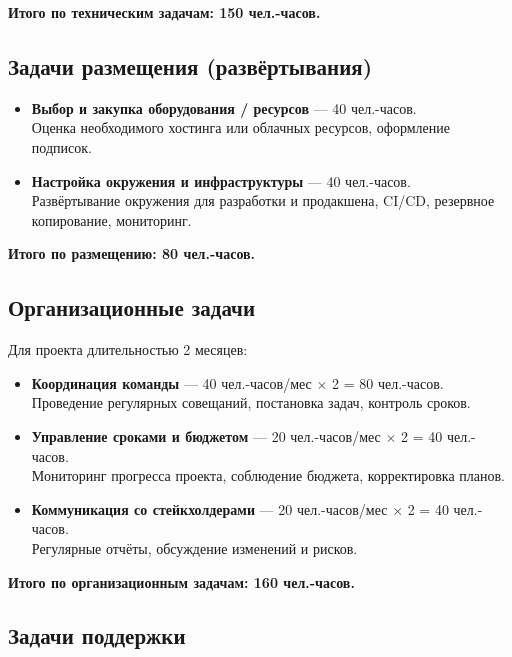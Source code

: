 \documentclass[14pt, russian]{matmex-diploma-custom}
\begin{document}
\textbf{Итого по техническим задачам: 150 чел.-часов.}

\subsection{Задачи размещения (развёртывания)}

\begin{itemize}
    \item \textbf{Выбор и закупка оборудования / ресурсов} — 40 чел.-часов.\\
    Оценка необходимого хостинга или облачных ресурсов, оформление подписок.

    \item \textbf{Настройка окружения и инфраструктуры} — 40 чел.-часов.\\
    Развёртывание окружения для разработки и продакшена, CI/CD, резервное копирование, мониторинг.
\end{itemize}

\textbf{Итого по размещению: 80 чел.-часов.}

\subsection{Организационные задачи}

Для проекта длительностью 2 месяцев:

\begin{itemize}
    \item \textbf{Координация команды} — 40 чел.-часов/мес $\times$ 2 = 80 чел.-часов.\\
    Проведение регулярных совещаний, постановка задач, контроль сроков.

    \item \textbf{Управление сроками и бюджетом} — 20 чел.-часов/мес $\times$ 2 = 40 чел.-часов.\\
    Мониторинг прогресса проекта, соблюдение бюджета, корректировка планов.

    \item \textbf{Коммуникация со стейкхолдерами} — 20 чел.-часов/мес $\times$ 2 = 40 чел.-часов.\\
    Регулярные отчёты, обсуждение изменений и рисков.
\end{itemize}

\textbf{Итого по организационным задачам: 160 чел.-часов.}

\subsection{Задачи поддержки}
\end{document}
